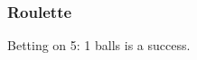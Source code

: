\documentclass[handout]{beamer}
\begin{document}


   \begin{frame}
   \frametitle{Roulette}
   \begin{center}
   \end{center}
   Betting on {\color{red} 5}: 1 balls is a success.
   \end{frame}

\end{document}

